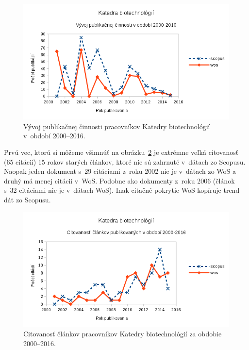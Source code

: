 \begin{figure}
  \centering
  \includegraphics[width=\textwidth]{obr/plot-biotech-publications.png}
  \caption{Vývoj publikačnej činnosti pracovníkov Katedry biotechnológií v~období 2000--2016.}
  \label{fig:plot.biotech.publications}
\end{figure}

Prvú vec, ktorú si môžeme všimnúť na obrázku~\ref{fig:plot.biotech.citations} je
extrémne veľká citovanosť (65 citácií) 15 rokov starých článkov, ktoré nie sú
zahrnuté v~dátach zo Scopusu.  Naopak jeden dokument s~29 citáciami z~roku 2002
nie je v~dátach zo WoS a druhý má menej citácií v~WoS.  Podobne ako dokumenty
z~roku 2006 (článok s~32 citáciami nie je v~dátach WoS).  Inak citačné pokrytie
WoS kopíruje trend dát zo Scopusu.

\begin{figure}
  \centering
  \includegraphics[width=\textwidth]{obr/plot-biotech-citations.png}
  \caption{Citovanosť článkov pracovníkov Katedry biotechnológií za obdobie 2000--2016.}
  \label{fig:plot.biotech.citations}
\end{figure}


